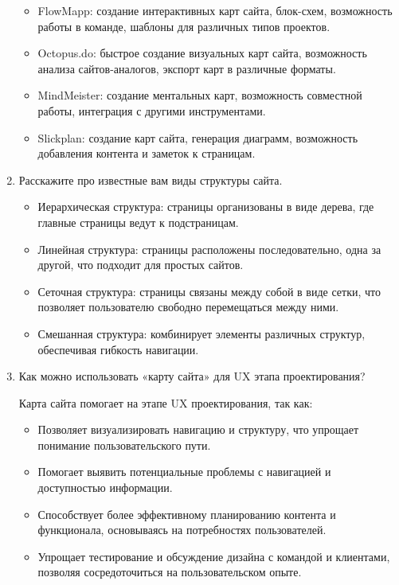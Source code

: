 \begin{enumerate}
        \begin{itemize}
            \item FlowMapp: создание интерактивных карт сайта, блок-схем, возможность работы в команде, шаблоны для различных типов проектов.
            \item Octopus.do: быстрое создание визуальных карт сайта, возможность анализа сайтов-аналогов, экспорт карт в различные форматы.
            \item MindMeister: создание ментальных карт, возможность совместной работы, интеграция с другими инструментами.
            \item Slickplan: создание карт сайта, генерация диаграмм, возможность добавления контента и заметок к страницам.
        \end{itemize}
    \item Расскажите про известные вам виды структуры сайта.

        \begin{itemize}
            \item Иерархическая структура: страницы организованы в виде дерева, где главные страницы ведут к подстраницам.
            \item Линейная структура: страницы расположены последовательно, одна за другой, что подходит для простых сайтов.
            \item Сеточная структура: страницы связаны между собой в виде сетки, что позволяет пользователю свободно перемещаться между ними.
            \item Смешанная структура: комбинирует элементы различных структур, обеспечивая гибкость навигации.
        \end{itemize}
    \item Как можно использовать «карту сайта» для UX этапа проектирования?

Карта сайта помогает на этапе UX проектирования, так как:
        \begin{itemize}
            \item Позволяет визуализировать навигацию и структуру, что упрощает понимание пользовательского пути.
            \item Помогает выявить потенциальные проблемы с навигацией и доступностью информации.
            \item Способствует более эффективному планированию контента и функционала, основываясь на потребностях пользователей.
            \item Упрощает тестирование и обсуждение дизайна с командой и клиентами, позволяя сосредоточиться на пользовательском опыте.
        \end{itemize}
\end{enumerate}


